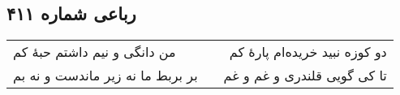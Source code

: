 \begin{center}
\section*{رباعی شماره ۴۱۱}
\label{sec:sh411}
\begin{longtable}{l p{0.5cm} r}
من دانگی و نیم داشتم حبهٔ کم
&&
دو کوزه نبید خریده‌ام پارهٔ کم
\\
بر بربط ما نه زیر ماندست و نه بم
&&
تا کی گویی قلندری و غم و غم
\\
\end{longtable}
\end{center}
